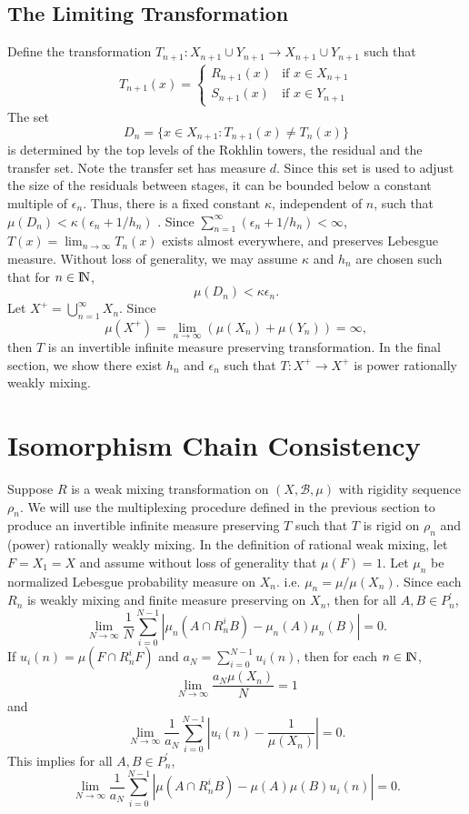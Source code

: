 \documentclass[12pt]{amsart}
\begin{document}
\subsection{The Limiting Transformation}
Define the transformation 
$T_{n+1}:X_{n+1}\cup Y_{n+1}\to X_{n+1}\cup Y_{n+1}$ such that 
\begin{eqnarray*} 
T_{n+1}(x)= 
\left\{\begin{array}{ll}
R_{n+1}(x) & \mbox{if $x\in X_{n+1}$} \\ 
S_{n+1}(x) & \mbox{if $x\in Y_{n+1}$} 
\end{array}
\right.
\end{eqnarray*}
The set 
\[
D_n = \{ x\in X_{n+1} : T_{n+1} (x) \neq T_n (x) \}
\] 
is determined by the top levels 
of the Rokhlin towers, the residual and the transfer set. 
Note the transfer set has measure $d$. Since this set is used to adjust 
the size of the residuals between stages, it can be bounded below 
a constant multiple of $\epsilon_n$. Thus, there is a fixed constant $\kappa$, 
independent of $n$, such that 
$\mu (D_n) < \kappa (\epsilon_n + {1}/{h_n})$ . 
Since $\sum_{n=1}^{\infty} (\epsilon_n + {1}/{h_n}) < \infty$, 
$T(x) = \lim_{n\to \infty}T_n(x)$ exists almost everywhere, 
and preserves Lebesgue measure. 
Without loss of generality, we may assume $\kappa$ and $h_n$ 
are chosen such that for $n\in {\hbox{\rm\setbox1=\hbox{I}\copy1\kern-.45\wd1 N}}$, 
\[
\mu (D_n) < \kappa \epsilon_n . 
\] 
Let $X^+ = \bigcup_{n=1}^{\infty} X_n$. 
Since 
\[
\mu(X^+) = \lim_{n\to \infty} (\mu(X_n) + \mu(Y_n)) = \infty,
\]
then $T$ is an invertible infinite measure preserving transformation. 
In the final section, we show there exist $h_n$ and $\epsilon_n$ 
such that $T:X^+ \to X^+$ is power rationally weakly mixing. 

\section{Isomorphism Chain Consistency}
Suppose $R$ is a weak mixing transformation on $(X,\mathcal{B},\mu)$ 
with rigidity sequence $\rho_n$.  
We will use the multiplexing procedure defined in the previous section 
to produce an invertible infinite measure preserving $T$ 
such that $T$ is rigid on $\rho_n$ and (power) rationally weakly mixing. 
In the definition of rational weak mixing, let $F=X_1 = X$ and assume without loss of generality 
that $\mu(F)=1$. Let $\mu_n$ be normalized Lebesgue probability measure on $X_n$. 
i.e. $\mu_n = {\mu} / {\mu(X_n)}$. 
Since each $R_n$ is weakly mixing and finite measure preserving on $X_n$, 
then for all $A,B\in P_n^{\prime}$, 
\[
\lim_{N\to \infty} \frac{1}{N}\sum_{i=0}^{N-1} | \mu_n(A\cap R_n^iB) - \mu_n(A)\mu_n(B) | = 0 . 
\]
If $u_i (n) = \mu(F\cap R_n^iF)$ and $a_N = \sum_{i=0}^{N-1} u_i (n)$, then 
for each $n\in {\hbox{\rm\setbox1=\hbox{I}\copy1\kern-.45\wd1 N}}$, 
\[
\lim_{N\to \infty} \frac{a_N \mu(X_n)}{N} = 1 
\]
and 
\[
\lim_{N\to \infty} \frac{1}{a_N} \sum_{i=0}^{N-1} | u_i (n) - \frac{1}{\mu(X_n)} | = 0 . 
\]
This implies for all $A,B\in P_n^{\prime}$, 
\[
\lim_{N\to \infty} \frac{1}{a_N} \sum_{i=0}^{N-1} | \mu(A\cap R_n^iB) - \mu(A)\mu(B)u_i (n)| = 0 . 
\] 
\end{document}

